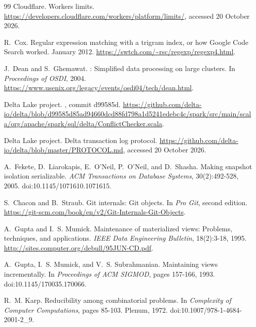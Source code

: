 \documentclass[11pt,letterpaper]{article}
\theoremstyle{definition}
\theoremstyle{remark}
\DeclareRobustCommand{\code}[1]{{\def\_{\textunderscore\allowbreak}\texttt{#1}}}
\begin{document}
\begin{thebibliography}{99}
Cloudflare.
\newblock Workers limits.
\newblock \url{https://developers.cloudflare.com/workers/platform/limits/}, accessed 20 October 2026.

R.~Cox.
\newblock Regular expression matching with a trigram index, or how {Google} {Code} {Search} worked.
\newblock January 2012.
\newblock \url{https://swtch.com/~rsc/regexp/regexp4.html}.

J.~Dean and S.~Ghemawat.
: Simplified data processing on large clusters.
\newblock In \emph{Proceedings of OSDI}, 2004.
\newblock \url{https://www.usenix.org/legacy/events/osdi04/tech/dean.html}.

Delta Lake project.
\newblock \code{ConflictChecker.scala}, commit d99585d.
\newblock \url{https://github.com/delta-io/delta/blob/d99585d85ad94660dcd88fd798a1d5241edebc4c/spark/src/main/scala/org/apache/spark/sql/delta/ConflictChecker.scala}.

Delta Lake project.
\newblock Delta transaction log protocol.
\newblock \url{https://github.com/delta-io/delta/blob/master/PROTOCOL.md}, accessed 20 October 2026.

A.~Fekete, D.~Liarokapis, E.~O'Neil, P.~O'Neil, and D.~Shasha.
\newblock Making snapshot isolation serializable.
\newblock \emph{ACM Transactions on Database Systems}, 30(2):492-528, 2005.
\newblock doi:10.1145/1071610.1071615.

S.~Chacon and B.~Straub.
\newblock Git internals: Git objects.
\newblock In \emph{Pro Git}, second edition.
\newblock \url{https://git-scm.com/book/en/v2/Git-Internals-Git-Objects}.

A.~Gupta and I.~S. Mumick.
\newblock Maintenance of materialized views: Problems, techniques, and applications.
\newblock \emph{IEEE Data Engineering Bulletin}, 18(2):3-18, 1995.
\newblock \url{http://sites.computer.org/debull/95JUN-CD.pdf}.

A.~Gupta, I.~S. Mumick, and V.~S. Subrahmanian.
\newblock Maintaining views incrementally.
\newblock In \emph{Proceedings of ACM SIGMOD}, pages 157-166, 1993.
\newblock doi:10.1145/170035.170066.

R.~M. Karp.
\newblock Reducibility among combinatorial problems.
\newblock In \emph{Complexity of Computer Computations}, pages 85-103. Plenum, 1972.
\newblock doi:10.1007/978-1-4684-2001-2\_9.


\end{thebibliography}
\end{document}
